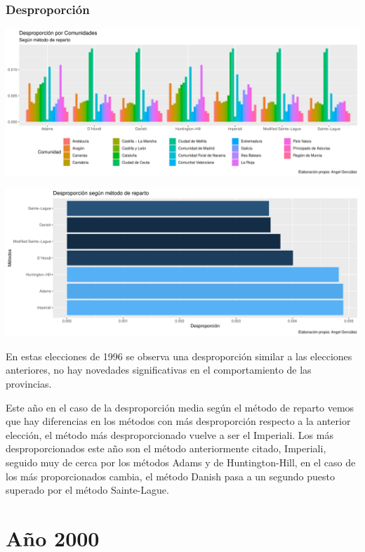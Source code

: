 \documentclass[12pt,a4paper,]{book}
\numberwithin{dummy}{section}
\theoremstyle{ocrenumbox}
\theoremstyle{blacknumex}
\theoremstyle{blacknumbox}
\theoremstyle{ocrenum}
\theoremstyle{ocrenum}
\begin{document}
\hypertarget{desproporciuxf3n-6}{%
\subsubsection{Desproporción}\label{desproporciuxf3n-6}}

\begin{center}\includegraphics[width=0.95\linewidth]{figurasR/unnamed-chunk-66-1} \end{center}

\begin{center}\includegraphics[width=0.95\linewidth]{figurasR/unnamed-chunk-66-2} \end{center}

En estas elecciones de 1996 se observa una desproporción similar a las
elecciones anteriores, no hay novedades significativas en el
comportamiento de las provincias.

Este año en el caso de la desproporción media según el método de reparto
vemos que hay diferencias en los métodos con más desproporción respecto
a la anterior elección, el método más desproporcionado vuelve a ser el
Imperiali. Los más desproporcionados este año son el método
anteriormente citado, Imperiali, seguido muy de cerca por los métodos
Adams y de Huntington-Hill, en el caso de los más proporcionados cambia,
el método Danish pasa a un segundo puesto superado por el método
Sainte-Lague.

\hypertarget{auxf1o-2000}{%
\section{Año 2000}\label{auxf1o-2000}}
\end{document}
